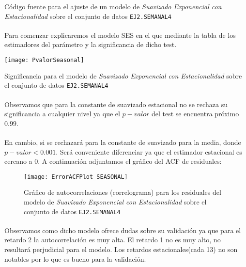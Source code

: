 \documentclass[a4paper, spanish]{article}
\begin{document}
      \begin{listing}[htb!]
        \centering
        \inputminted{SAS}{./res/code/b-01-esm-seasonal.sas}
        \caption{Código fuente para el ajuste de un modelo de \emph{Suavizado Exponencial con Estacionalidad} sobre el conjunto de datos \texttt{EJ2.SEMANAL4}}
        \label{code:b_seasonal_esm}
      \end{listing}

      \paragraph{}
      Para comenzar explicaremos el modelo SES en el que mediante la tabla de los estimadores del parámetro y la significancia de dicho test.

      \begin{table}[htb!]
        \centering
        \texttt{[image: PvalorSeasonal]}
        \caption{Significancia para el modelo de \emph{Suavizado Exponencial con Estacionalidad} sobre el conjunto de datos \texttt{EJ2.SEMANAL4}}
        \label{table:b_seasonal_significance}
      \end{table}

      \paragraph{}
      Observamos que para la constante de suavizado estacional no se rechaza su significancia a cualquier nivel ya que el $p-valor$ del test se encuentra próximo $0.99$.

      \paragraph{}
      En cambio, si se rechazará para la constante de suavizado para la media, donde $p-valor < 0.001$. Será conveniente diferenciar ya que el estimador estacional es cercano a 0. A continuación adjuntamos el gráfico del ACF de residuales:

      \begin{figure}[htb!]
        \centering
        \texttt{[image: ErrorACFPlot\_SEASONAL]}
        \caption{Gráfico de autocorrelaciones (correlograma) para los residuales del modelo de \emph{Suavizado Exponencial con Estacionalidad} sobre el conjunto de datos \texttt{EJ2.SEMANAL4}}
        \label{img:b_seasonal_residuals_correlogram}
      \end{figure}

      \paragraph{}
      Observamos como dicho modelo ofrece dudas sobre su validación ya que para el retardo 2 la autocorrelación es muy alta. El retardo 1 no es muy alto, no resultará perjudicial para el modelo. Los retardos estacionales(cada 13) no son notables por lo que es bueno para la validación.
\end{document}
